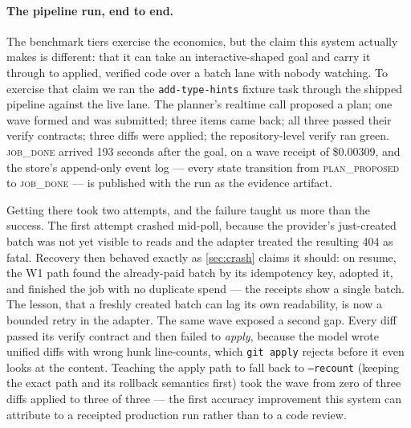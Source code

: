 \documentclass[11pt]{article}
\begin{document}
\paragraph{The pipeline run, end to end.} The benchmark tiers exercise
the economics, but the claim this system actually makes is different:
that it can take an interactive-shaped goal and carry it through to
applied, verified code over a batch lane with nobody watching. To
exercise that claim we ran the \texttt{add-type-hints} fixture task
through the shipped pipeline against the live lane. The planner's
realtime call proposed a plan; one wave formed and was submitted; three
items came back; all three passed their verify contracts; three diffs
were applied; the repository-level verify ran green. \textsc{job\_done}
arrived 193 seconds after the goal, on a wave receipt of \$0.00309, and
the store's append-only event log --- every state transition from
\textsc{plan\_proposed} to \textsc{job\_done} --- is published with the
run as the evidence artifact.

Getting there took two attempts, and the failure taught us more than the
success. The first attempt crashed mid-poll, because the provider's
just-created batch was not yet visible to reads and the adapter treated
the resulting 404 as fatal. Recovery then behaved exactly as
\cref{sec:crash} claims it should: on resume, the W1 path found the
already-paid batch by its idempotency key, adopted it, and finished the
job with no duplicate spend --- the receipts show a single batch. The
lesson, that a freshly created batch can lag its own readability, is now
a bounded retry in the adapter. The same wave exposed a second gap.
Every diff passed its verify contract and then failed to \emph{apply},
because the model wrote unified diffs with wrong hunk line-counts, which
\texttt{git apply} rejects before it even looks at the content. Teaching
the apply path to fall back to \texttt{--recount} (keeping the exact
path and its rollback semantics first) took the wave from zero of three
diffs applied to three of three --- the first accuracy improvement this
system can attribute to a receipted production run rather than to a code
review.
\end{document}
